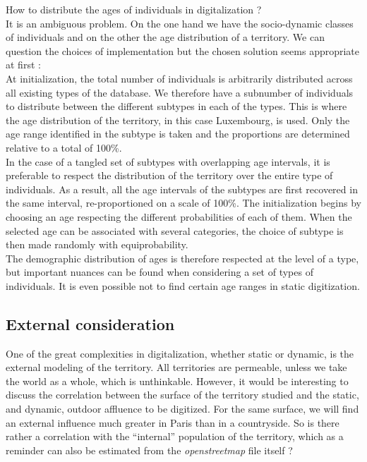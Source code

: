 How to distribute the ages of individuals in digitalization ?\\

It is an ambiguous problem. On the one hand we have the socio-dynamic classes of individuals and on the other the age distribution of a territory. We can question the choices of implementation but the chosen solution seems appropriate at first :\\

At initialization, the total number of individuals is arbitrarily distributed across all existing types of the database. We therefore have a subnumber of individuals to distribute between the different subtypes in each of the types. This is where the age distribution of the territory, in this case Luxembourg, is used. Only the age range identified in the subtype is taken and the proportions are determined relative to a total of 100\%.\\

In the case of a tangled set of subtypes with overlapping age intervals, it is preferable to respect the distribution of the territory over the entire type of individuals. As a result, all the age intervals of the subtypes are first recovered in the same interval, re-proportioned on a scale of 100\%. The initialization begins by choosing an age respecting the different probabilities of each of them. When the selected age can be associated with several categories, the choice of subtype is then made randomly with equiprobability.\\

The demographic distribution of ages is therefore respected at the level of a type, but important nuances can be found when considering a set of types of individuals. It is even possible not to find certain age ranges in static digitization.\\

\subsection{External consideration}

One of the great complexities in digitalization, whether static or dynamic, is the external modeling of the territory. All territories are permeable, unless we take
the world as a whole, which is unthinkable. However, it would be interesting to discuss the correlation between the surface of the territory studied and the static, and dynamic, outdoor affluence to be digitized. For the same surface, we will find an external influence much greater in Paris than in a countryside. So is there rather a correlation with the ``internal'' population of the territory, which as a reminder can also be estimated from the \textit{openstreetmap} file itself ?\\

